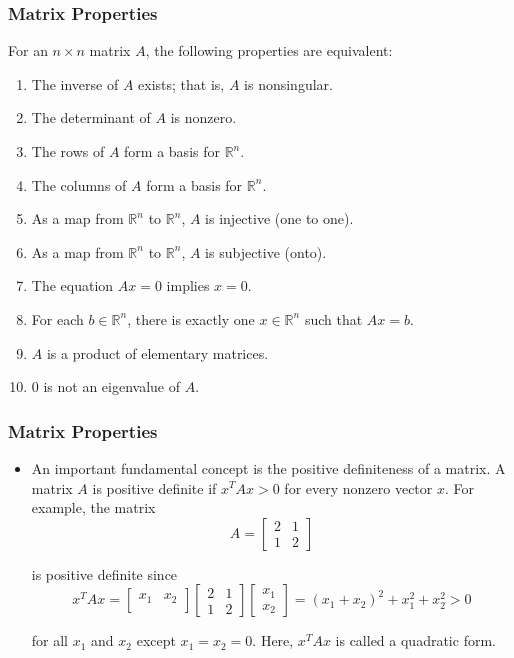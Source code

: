 \documentclass[notheorems,mathserif,table,compress]{beamer}  %
\begin{document}
\begin{frame}
\frametitle{Matrix Properties}
\begin{theorem}
For an $n\times n$ matrix $A$, the following properties are equivalent:
\begin{enumerate}
\item The inverse of $A$ exists; that is, $A$ is nonsingular.
\item The determinant of $A$ is nonzero.
\item The rows of $A$ form a basis for $\mathbb{R}^n$.
\item The columns of $A$ form a basis for $\mathbb{R}^n$.
\item As a map from $\mathbb{R}^n$ to $\mathbb{R}^n$, $A$ is injective (one to one).
\item As a map from $\mathbb{R}^n$ to $\mathbb{R}^n$, $A$ is subjective (onto).
\item The equation $Ax=0$ implies $x=0$.
\item For each $b\in \mathbb{R}^n$, there is exactly one $x\in \mathbb{R}^n$ such that $Ax=b$.
\item $A$ is a product of elementary matrices.
\item 0 is not an eigenvalue of $A$.
\end{enumerate}
\end{theorem}

\end{frame}

\begin{frame}
\frametitle{Matrix Properties}
\begin{itemize}
\item An important fundamental concept is the \textsf{positive definiteness} of a matrix. A matrix $A$ is \textsf{positive definite} if $x^TAx>0$ for every nonzero vector $x$. For example, the matrix
\begin{displaymath}
A=\begin{bmatrix}
2 & 1\\
1 & 2 
\end{bmatrix}
\end{displaymath}

is positive definite since
\begin{displaymath}
x^TAx=
\begin{bmatrix}
x_1 & x_2\\
\end{bmatrix}
\begin{bmatrix}
2 & 1\\
1 & 2 
\end{bmatrix}
\begin{bmatrix}
x_1\\
x_2 
\end{bmatrix}
=(x_1+x_2)^2+x_1^2+x_2^2>0
\end{displaymath}

for all $x_1$ and $x_2$ except $x_1=x_2=0$. Here, $x^TAx$ is called a \textsf{quadratic form}.
\end{itemize}
\end{frame}
\end{document}
